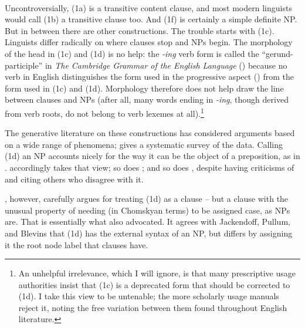 \documentclass[output=paper,colorlinks,citecolor=brown
]{langscibook}
\begin{document}
\ea \ea {} \\
    \ex {}  \\
    \ex {} \\
    \ex {} \\
    \ex {} \\
    \ex {} \\
    \z
\z
\noindent
Uncontroversially, (1a) is a transitive content clause, and most
modern linguists would call (1b) a transitive clause too.
And (1f) is certainly a simple definite NP. But in between there are
other constructions. The trouble starts with (1c). Linguists differ
radically on where clauses stop and NPs begin.
The morphology of the head in (1c) and (1d) is no help:
the \textit{-ing} verb form is called the ``gerund-participle'' in
\textit{The Cambridge Grammar of the English Language}
(\citealt{HuddPull02}) because no verb in English distinguishes the form
used in the progressive aspect () from the form used
in (1c) and (1d). Morphology therefore does not help draw the line
between clauses and NPs (after all, many words ending in
\mbox{\itshape-ing}, though derived from verb roots, do not belong
to verb lexemes at all).\footnote{\label{gerundsubject}
   An unhelpful irrelevance, which I will ignore, is that many
   prescriptive usage authorities insist that (1c) is a deprecated
   form that should be corrected to (1d). I take this view to be
   untenable; the more scholarly usage manuals reject it, noting the
   free variation between them found throughout English literature.}

The generative literature on these constructions has considered
arguments based on a wide range of phenomena; \citet{Pullum91}
gives a systematic survey of the data. Calling (1d) an NP accounts
nicely for the way it can be the object of a preposition, as in
. \citet[222--223]{Jackendoff77} accordingly takes that view; so
does \citet{Pullum91}; and so does \citet{Blevins05}, despite having
criticisms of \citet{Pullum91} and citing others who disagree with it.

\citet{Kiparsky17}, however, carefully argues for treating (1d) as
a clause -- but a clause with the unusual property of needing (in
Chomskyan terms) to be assigned case, as NPs are. That is essentially
what \citet{Stowell81} also advocated. It agrees with Jackendoff,
Pullum, and Blevins that (1d) has the external syntax of an NP, but
differs by assigning it the root node label that clauses have.
\end{document}
